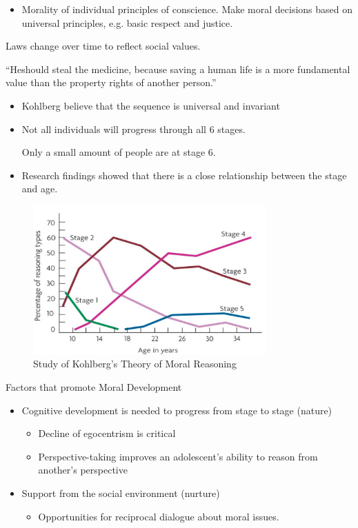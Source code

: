 \documentclass[../main/main.tex]{subfiles}
\begin{document}
\begin{description}
\begin{itemize}
          \item Morality of individual principles of conscience. Make moral decisions based on universal principles, e.g. basic respect and justice.
        \end{itemize}
        \begin{remark}
Laws change over time to reflect social values.
        \end{remark}
        \begin{example}
          ``Heshould steal the medicine, because saving a human life is a more fundamental value than the property rights of another person.''
        \end{example}
\end{description}
\begin{itemize}
  \item Kohlberg believe that the sequence is universal and invariant
        \item Not all individuals will progress through all 6 stages.
        \begin{remark}
Only a small amount of people are at stage 6.
        \end{remark}
        \item Research findings showed that there is a close relationship between the stage and age.
\end{itemize}
\begin{figure}[htpb]
	\centering
	\includegraphics[width=0.8\textwidth]{../images/3-17-log}
	\caption{Study of Kohlberg's Theory of Moral Reasoning}
	\label{fig:}
\end{figure}
Factors that promote Moral Development
\begin{itemize}
\item Cognitive development is needed to progress from stage to stage (nature)
        \begin{itemize}
\item Decline of egocentrism is critical
                \item Perspective-taking improves an adolescent's ability to reason from another's perspective
        \end{itemize}
  \item Support from the social environment (nurture)
        \begin{itemize}
\item Opportunities for reciprocal dialogue about moral issues.
        \end{itemize}
\end{itemize}
\end{document}
